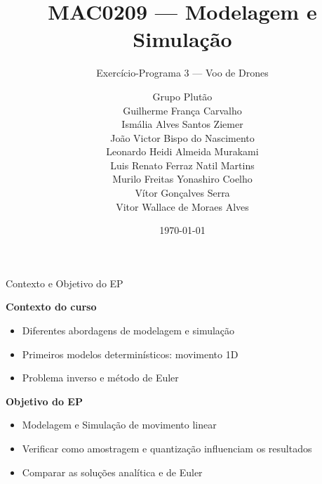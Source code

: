 \documentclass[aspectratio=169]{beamer}
\title{MAC0209 --- Modelagem e Simulação}
\subtitle{Exercício-Programa 3 --- Voo de Drones}
\author[Grupo Plutão]{Grupo Plutão \\[4pt]
Guilherme França Carvalho \\
Ismália Alves Santos Ziemer \\
João Victor Bispo do Nascimento \\
Leonardo Heidi Almeida Murakami \\
Luis Renato Ferraz Natil Martins \\
Murilo Freitas Yonashiro Coelho \\
Vítor Gonçalves Serra \\
Vitor Wallace de Moraes Alves }
\institute[BCC IME-USP]{Bacharelado em Ciência da Computação \\ IME -- USP}
\date{\today}
\begin{document}
\begin{frame}
\titlepage
\end{frame}

\begin{frame}{Contexto e Objetivo do EP}

\textbf{Contexto do curso}

\begin{itemize}
    \item Diferentes abordagens de modelagem e simulação
    \item Primeiros modelos determinísticos: movimento 1D
    \item Problema inverso e método de Euler
\end{itemize}

\vspace{0.5cm}

\textbf{Objetivo do EP}

\begin{itemize}
    \item Modelagem e Simulação de movimento linear
    \item Verificar como amostragem e quantização influenciam os resultados
    \item Comparar as soluções analítica e de Euler
\end{itemize}

\end{frame}
\end{document}
